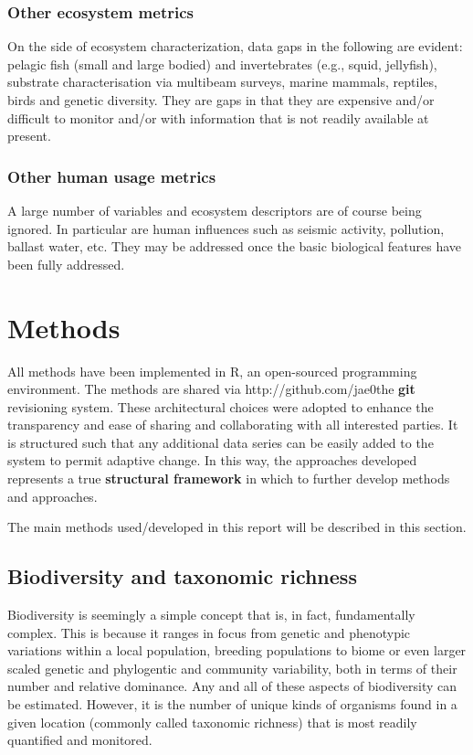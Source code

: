 \documentclass[letterpaper,portrait,11pt]{scrartcl}
\numberwithin{equation}{section}    %
\numberwithin{figure}{section}    %
\numberwithin{table}{section}       %
\begin{document}
\subsubsection{Other ecosystem metrics}
On the side of ecosystem characterization, data gaps in the following are evident: pelagic fish (small and large bodied) and invertebrates (e.g., squid, jellyfish), substrate characterisation via multibeam surveys, marine mammals, reptiles, birds and genetic diversity. They are gaps in that they are expensive and/or difficult to monitor and/or with information that is not readily available at present.

\subsubsection{Other human usage metrics}
A large number of variables and ecosystem descriptors are of course being ignored. In particular are human influences such as seismic activity, pollution, ballast water, etc. They may be addressed once the basic biological features have been fully addressed.


\afterpage{\clearpage}
\section{Methods}
\label{sec:methods}

All methods have been implemented in R, an open-sourced programming environment. The methods are shared via http://github.com/jae0the \textbf{git} revisioning system. These architectural choices were adopted to enhance the transparency and ease of sharing and collaborating with all interested parties. It is structured such that any additional data series can be easily added to the system to permit adaptive change. In this way, the approaches developed represents a true \textbf{structural framework} in which to further develop methods and approaches.

The main methods used/developed in this report will be described in this section.


\subsection{Biodiversity and taxonomic richness}


Biodiversity is seemingly a simple concept that is, in fact, fundamentally complex. This is because it ranges in focus from genetic and phenotypic variations within a local population, breeding populations to biome or even larger scaled genetic and phylogentic and community variability, both in terms of their number and relative dominance. Any and all of these aspects of biodiversity can be estimated. However, it is the number of unique kinds of organisms found in a given location (commonly called taxonomic richness) that is most readily quantified and monitored.
\end{document}
